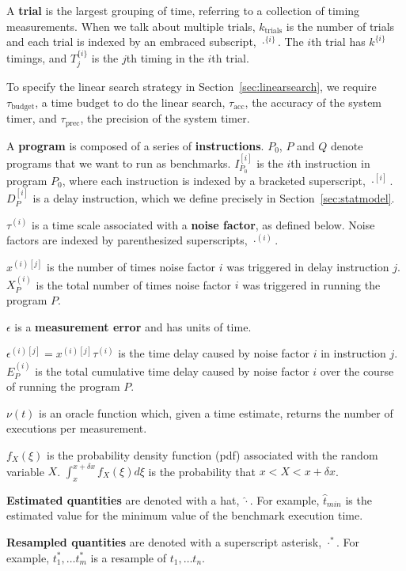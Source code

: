 \documentclass[conference]{IEEEtran}
\begin{document}
A \textbf{trial} is the largest grouping of time, referring to a collection of timing measurements. When we talk about multiple trials, $k_{\textrm{trials}}$ is the number of trials and each trial is indexed by an embraced subscript, $\cdot^{\{i\}}$. The $i$th trial has $k^{\{i\}}$ timings, and $T^{\{i\}}_j$ is the $j$th timing in the $i$th trial.

To specify the linear search strategy in Section~\ref{sec:linearsearch}, we require
$\tau_{\textrm{budget}}$, a time budget to do the linear search,
$\tau_{\textrm{acc}}$, the accuracy of the system timer, and
$\tau_{\textrm{prec}}$, the precision of the system timer.


A \textbf{program} is composed of a series of \textbf{instructions}. $P_0$, $P$ and $Q$ denote programs that we want to run as benchmarks. $I^{[i]}_{P_0}$ is the $i$th instruction in program $P_0$, where each instruction is indexed by a bracketed superscript, $\cdot^{[i]}$. $D^{[i]}_{P}$ is a delay instruction, which we define precisely in Section~\ref{sec:statmodel}.

$\tau^{(i)}$ is a time scale associated with a \textbf{noise factor}, as defined below. Noise factors are indexed by parenthesized superscripts, $\cdot^{(i)}$.

$x^{(i)[j]}$ is the number of times noise factor $i$ was triggered in delay instruction $j$. $X_P^{(i)}$ is the total number of times noise factor $i$ was triggered in running the program $P$.

$\epsilon$ is a \textbf{measurement error} and has units of time.

$\epsilon^{(i)[j]} = x^{(i)[j]} \tau^{(i)}$ is the time delay caused by noise factor $i$ in instruction $j$. $E_P^{(i)}$ is the total cumulative time delay caused by noise factor $i$ over the course of running the program $P$.

$\nu(t)$ is an oracle function which, given a time estimate, returns the number of executions per measurement.

$f_X(\xi)$ is the probability density function (pdf) associated with the random variable $X$. $\int_{x}^{x+\delta x} f_X(\xi) d\xi$ is the probability that $x < X < x+\delta x$.

\textbf{Estimated quantities} are denoted with a hat, $\hat\cdot$. For example, $\hat t_{min}$ is the estimated value for the minimum value of the benchmark execution time.

\textbf{Resampled quantities} are denoted with a superscript asterisk, $\cdot^*$. For example, $t^*_1, \dots t^*_m$ is a resample of $t_1, \dots t_n$.
\end{document}
